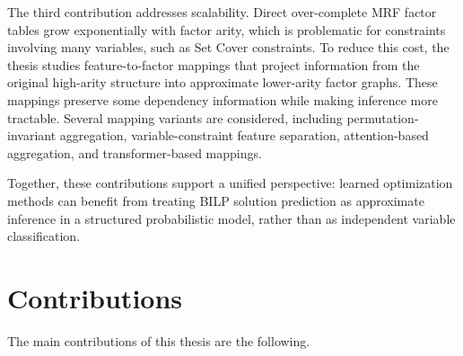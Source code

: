 The third contribution addresses scalability. Direct over-complete MRF factor tables grow exponentially with factor arity, which is problematic for constraints involving many variables, such as Set Cover constraints. To reduce this cost, the thesis studies feature-to-factor mappings that project information from the original high-arity structure into approximate lower-arity factor graphs. These mappings preserve some dependency information while making inference more tractable. Several mapping variants are considered, including permutation-invariant aggregation, variable-constraint feature separation, attention-based aggregation, and transformer-based mappings.

Together, these contributions support a unified perspective: learned optimization methods can benefit from treating BILP solution prediction as approximate inference in a structured probabilistic model, rather than as independent variable classification.

\section{Contributions}

The main contributions of this thesis are the following.


